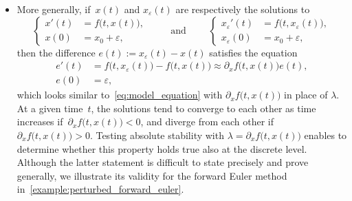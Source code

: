 \begin{itemize}
    \item
        More generally, if~$x(t)$ and $x_{\varepsilon}(t)$ are respectively the solutions to
        \begin{equation}
            \label{eq:multiscale_autonomous}
            \left\{
            \begin{aligned}
                x'(t) &= f\bigl(t, x(t)\bigr), \\
                x(0) &= x_0 + \varepsilon,
            \end{aligned}
            \right.
            \qquad
            \text{ and }
            \qquad
            \left\{
            \begin{aligned}
                x_{\varepsilon}'(t) &= f\bigl(t, x_{\varepsilon}(t)\bigr), \\
                x_{\varepsilon}(0) &= x_0 + \varepsilon,
            \end{aligned}
            \right.
        \end{equation}
        then the difference $e(t) := x_{\varepsilon}(t) - x(t)$ satisfies the equation
        \begin{equation}
            \label{eq:ode_error_equation}
            \begin{aligned}
                e'(t) &= f\bigl(t, x_{\varepsilon}(t)\bigr) - f\bigl(t, x(t)\bigr) \approx \partial_x f\bigl(t,x(t)\bigr) e(t), \\
                e(0) &= \varepsilon,
            \end{aligned}
        \end{equation}
        which looks similar to~\eqref{eq:model_equation} with $\partial_x f\bigl(t,x(t)\bigr)$ in place of $\lambda$.
        At a given time~$t$,
        the solutions tend to converge to each other as time increases
        if~$\partial_x f\bigl(t, x(t)\bigr) < 0$,
        and diverge from each other if $\partial_x f\bigl(t, x(t)\bigr) > 0$.
        Testing absolute stability with $\lambda = \partial_x f\bigl(t, x(t)\bigr)$ enables to determine whether this property holds true also at the discrete level.
        Although the latter statement is difficult to state precisely and prove generally,
        we illustrate its validity for the forward Euler method in~\cref{example:perturbed_forward_euler}.
\end{itemize}

